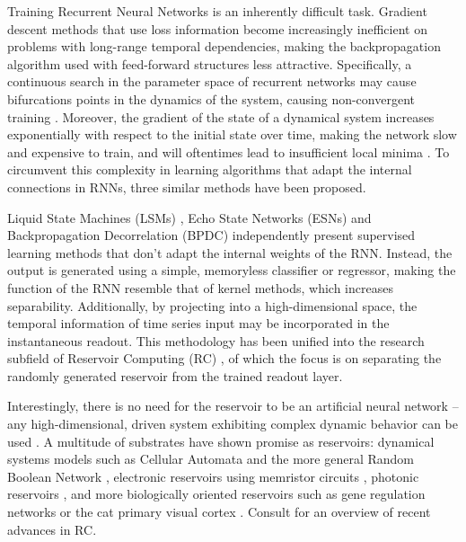 Training Recurrent Neural Networks is an inherently difficult task. Gradient
descent methods that use loss information become increasingly inefficient on
problems with long-range temporal dependencies, making the backpropagation
algorithm used with feed-forward structures less attractive. Specifically, a
continuous search in the parameter space of recurrent networks may cause
bifurcations points in the dynamics of the system, causing non-convergent
training \cite{doya_bifurcations_nodate}. Moreover, the gradient of the state of
a dynamical system increases exponentially with respect to the initial state
over time, making the network slow and expensive to train, and will oftentimes
lead to insufficient local minima \cite{bengio_learning_1994}. To circumvent
this complexity in learning algorithms that adapt the internal connections in
RNNs, three similar methods have been proposed.

Liquid State Machines (LSMs) \cite{maass_real-time_2002}, Echo State Networks
(ESNs) \cite{jaeger_echo_2001} and Backpropagation Decorrelation (BPDC)
\cite{steil_backpropagation-decorrelation:_2004} independently present
supervised learning methods that don't adapt the internal weights of the
RNN. Instead, the output is generated using a simple, memoryless classifier or
regressor, making the function of the RNN resemble that of kernel methods, which
increases separability. Additionally, by projecting into a high-dimensional
space, the temporal information of time series input may be incorporated in the
instantaneous readout. This methodology has been unified into the research
subfield of Reservoir Computing (RC) \cite{schrauwen_overview_2007}, of which
the focus is on separating the randomly generated reservoir from the trained
readout layer.

Interestingly, there is no need for the reservoir to be an artificial neural
network -- any high-dimensional, driven system exhibiting complex dynamic
behavior can be used \cite{schrauwen_overview_2007}. A multitude of substrates
have shown promise as reservoirs: dynamical systems models such as Cellular
Automata \cite{nichele_deep_2017} and the more general Random Boolean Network
\cite{snyder_computational_2013}, electronic reservoirs using memristor circuits
\cite{kulkarni_memristor-based_2012}, photonic reservoirs
\cite{vandoorne_experimental_2014}, and more biologically oriented reservoirs
such as gene regulation networks \cite{jones_is_2007} or the cat primary visual
cortex \cite{scholkopf_temporal_2007}. Consult \cite{tanaka_recent_2018} for an
overview of recent advances in RC.

